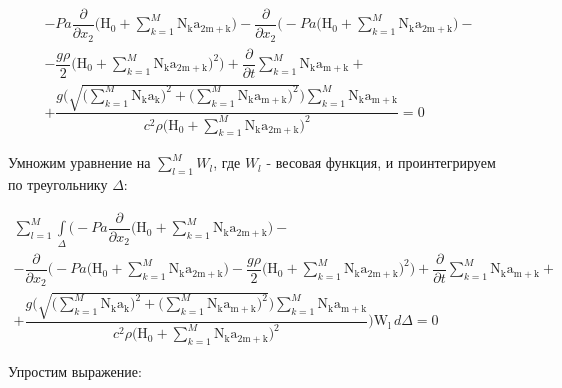 \documentclass[14pt]{extreport}
\begin{document}
\begin{multline*}
- Pa \dfrac{\partial}{\partial x_{2}}\bigg(\operatorname{H_{0}} + \sum_{k=1}^{M} \operatorname{N_{k}} \operatorname{a_{2m+k}}\bigg)  - \dfrac{\partial}{\partial x_{2}}\bigg(- Pa \bigg(\operatorname{H_{0}} + \sum_{k=1}^{M} \operatorname{N_{k}} \operatorname{a_{2m+k}}\bigg) -\\- \dfrac{g \rho}{2} \bigg(\operatorname{H_{0}} + \sum_{k=1}^{M} \operatorname{N_{k}} \operatorname{a_{2m+k}}\bigg)^{2}\bigg) + \dfrac{\partial}{\partial t} \sum\limits_{k=1}^{M} \operatorname{N_{k}} \operatorname{a_{m+k}} +\\+ \dfrac{g \bigg(\sqrt{\bigg(\sum\limits_{k=1}^{M} \operatorname{N_{k}} \operatorname{a_{k}}\bigg)^{2} + \bigg(\sum\limits_{k=1}^{M} \operatorname{N_{k}} \operatorname{a_{m+k}}\bigg)^{2}}\bigg) \sum\limits_{k=1}^{M} \operatorname{N_{k}} \operatorname{a_{m+k}}}{c^{2} \rho \bigg(\operatorname{H_{0}} + \sum\limits_{k=1}^{M} \operatorname{N_{k}} \operatorname{a_{2m+k}}\bigg)^{2}} = 0
\end{multline*}

Умножим уравнение на $\sum\limits_{l=1}^{M} W_l$, где $W_l$ - весовая функция, и проинтегрируем по треугольнику $\Delta$:

\begin{multline*}
\sum_{l=1}^{M} \int\limits_{\Delta} \bigg(- Pa \dfrac{\partial}{\partial x_{2}}\bigg(\operatorname{H_{0}} + \sum_{k=1}^{M} \operatorname{N_{k}} \operatorname{a_{2m+k}}\bigg) -\\- \dfrac{\partial}{\partial x_{2}}\bigg(- Pa \bigg(\operatorname{H_{0}} + \sum\limits_{k=1}^{M} \operatorname{N_{k}} \operatorname{a_{2m+k}}\bigg) - \dfrac{g \rho}{2} \bigg(\operatorname{H_{0}} + \sum\limits_{k=1}^{M} \operatorname{N_{k}} \operatorname{a_{2m+k}}\bigg)^{2}\bigg) + \dfrac{\partial}{\partial t} \sum\limits_{k=1}^{M} \operatorname{N_{k}} \operatorname{a_{m+k}} +\\+ \dfrac{g \bigg(\sqrt{\bigg(\sum\limits_{k=1}^{M} \operatorname{N_{k}} \operatorname{a_{k}}\bigg)^{2} + \bigg(\sum\limits_{k=1}^{M} \operatorname{N_{k}} \operatorname{a_{m+k}}\bigg)^{2}}\bigg) \sum\limits_{k=1}^{M} \operatorname{N_{k}} \operatorname{a_{m+k}}}{c^{2} \rho \bigg(\operatorname{H_{0}} + \sum\limits_{k=1}^{M} \operatorname{N_{k}} \operatorname{a_{2m+k}}\bigg)^{2}}\bigg) \operatorname{W_{l}}\, d\Delta = 0
\end{multline*}

Упростим выражение:
\end{document}
